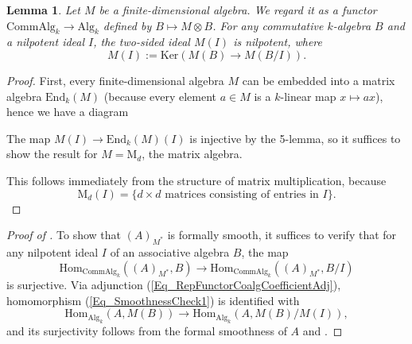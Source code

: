 \documentclass{article}
\numberwithin{equation}{section} %
\theoremstyle{plain}
\newtheorem{lemma}[theorem]{Lemma}
\theoremstyle{definition}
\theoremstyle{remark}
\begin{document}
\begin{lemma}\label{Lemma_PushDownNilpIdeals}
Let $M$ be a finite-dimensional algebra.
We regard it as a functor $\bm{\mathrm{CommAlg}}_k\to\bm{\mathrm{Alg}}_k$ defined by $B\mapsto M\otimes B$.
For any commutative $k$-algebra $B$ and a nilpotent ideal $I$, the two-sided ideal $M(I)$ is nilpotent, where
\begin{equation*}
M(I):=\mathrm{Ker}(M(B)\to M(B/I)).
\end{equation*}
\end{lemma}
\begin{proof}
First, every finite-dimensional algebra $M$ can be embedded into a matrix algebra $\mathrm{End}_k(M)$ (because every element $a\in M$ is a $k$-linear map $x\mapsto ax$), hence we have a diagram
\begin{center}
\end{center}
The map $M(I)\to\mathrm{End}_k(M)(I)$ is injective by the 5-lemma, so it suffices to show the result for $M=\mathrm{M}_d$, the matrix algebra.

This follows immediately from the structure of matrix multiplication, because
\begin{equation*}
\mathrm{M}_d(I)=\{d\times d\text{ matrices consisting of entries in }I\}.
\end{equation*}
\end{proof}

\begin{proof}[Proof of ]
To show that $(A)_{M^*}$ is formally smooth, it suffices to verify that for any nilpotent ideal $I$ of an associative algebra $B$, the map
\begin{equation}\label{Eq_SmoothnessCheck1}
\mathrm{Hom}_{\bm{\mathrm{CommAlg}}_k}((A)_{M^*},B)\to\mathrm{Hom}_{\bm{\mathrm{CommAlg}}_k}((A)_{M^*},B/I)
\end{equation}
is surjective.
Via adjunction (\ref{Eq_RepFunctorCoalgCoefficientAdj}), homomorphism (\ref{Eq_SmoothnessCheck1}) is identified with
\begin{equation}\label{Eq_SmoothnessCheck2}
\mathrm{Hom}_{\bm{\mathrm{Alg}}_k}(A,M(B))\to\mathrm{Hom}_{\bm{\mathrm{Alg}}_k}(A,M(B)/M(I)),
\end{equation}
and its surjectivity follows from the formal smoothness of $A$ and .
\end{proof}
\end{document}
